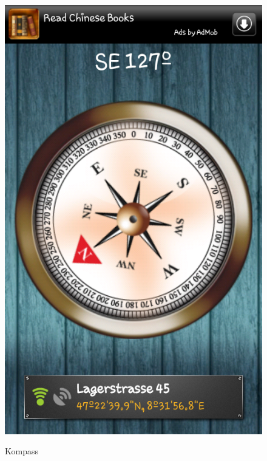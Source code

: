 \begin{figure}[H]
	\centering			      
        \includegraphics[scale=0.35, trim=5mm 6cm 5mm 6cm, clip]{images/kompass.png}\\
		\caption{Kompass}
	\label{fig:kompass}
\end{figure}
